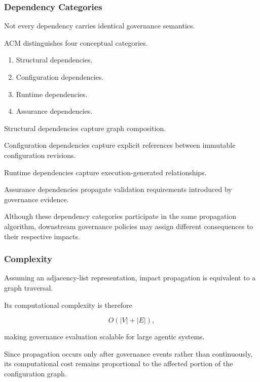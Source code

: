 \documentclass[10pt]{article}
\begin{document}
\subsubsection{Dependency Categories}

Not every dependency carries identical governance semantics.

ACM distinguishes four conceptual categories.

\begin{enumerate}
    \item Structural dependencies.
    \item Configuration dependencies.
    \item Runtime dependencies.
    \item Assurance dependencies.
\end{enumerate}

Structural dependencies capture graph composition.

Configuration dependencies capture explicit references between immutable
configuration revisions.

Runtime dependencies capture execution-generated relationships.

Assurance dependencies propagate validation requirements introduced by
governance evidence.

Although these dependency categories participate in the same propagation
algorithm, downstream governance policies may assign different consequences to
their respective impacts.

\subsubsection{Complexity}

Assuming an adjacency-list representation, impact propagation is equivalent to
a graph traversal.

Its computational complexity is therefore

\begin{equation}
O(|V|+|E|),
\label{eq:complexity}
\end{equation}

making governance evaluation scalable for large agentic systems.

Since propagation occurs only after governance events rather than continuously,
its computational cost remains proportional to the affected portion of the
configuration graph.
\end{document}
